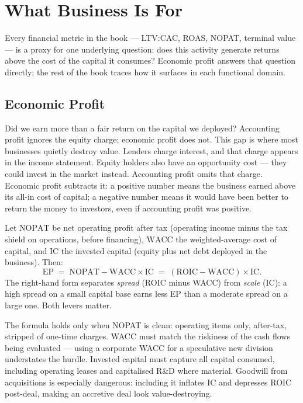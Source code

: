 \chapter{What Business Is For}\label{ch:value-creation}


Every financial metric in the book --- LTV:CAC, ROAS, NOPAT, terminal value --- is a
proxy for one underlying question: does this activity generate returns above the cost of the
capital it consumes? Economic profit answers that question directly; the rest of the book
traces how it surfaces in each functional domain.

\section{Economic Profit}\label{sec:economic-profit}

Did we earn more than a fair return on the capital we deployed? Accounting profit ignores the
equity charge; economic profit does not. This gap is where most businesses quietly destroy value.
Lenders charge interest, and that charge appears in the income statement. Equity holders also
have an opportunity cost --- they could invest in the market instead. Accounting profit omits
that charge. Economic profit subtracts it: a positive number means the business earned above its
all-in cost of capital; a negative number means it would have been better to return the money to
investors, even if accounting profit was positive.

Let \(\mathrm{NOPAT}\) be net operating profit after tax (operating income minus the tax shield on
operations, before financing), \(\mathrm{WACC}\) the weighted-average cost of capital, and
\(\mathrm{IC}\) the invested capital (equity plus net debt deployed in the business). Then:
\begin{equation}\label{eq:economic-profit}
  \mathrm{EP}
    \;=\; \mathrm{NOPAT} - \mathrm{WACC}\times\mathrm{IC}
    \;=\; (\mathrm{ROIC}-\mathrm{WACC})\times\mathrm{IC}.
\end{equation}
The right-hand form separates \emph{spread} (ROIC minus WACC) from \emph{scale} (IC): a high
spread on a small capital base earns less EP than a moderate spread on a large one. Both levers matter.

The formula holds only when NOPAT is clean: operating items only, after-tax, stripped of
one-time charges. WACC must match the riskiness of the cash flows being evaluated --- using a
corporate WACC for a speculative new division understates the hurdle. Invested capital must
capture all capital consumed, including operating leases and capitalised R\&D where material.
Goodwill from acquisitions is especially dangerous: including it inflates IC and depresses ROIC
post-deal, making an accretive deal look value-destroying.

